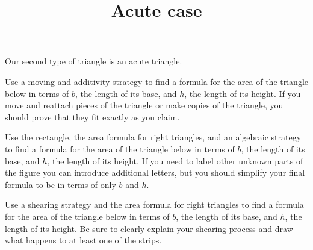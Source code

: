 \documentclass[nooutcomes,noauthor]{ximera}
\title{Acute case}
\begin{document}
\begin{abstract}
\end{abstract}

\maketitle

Our second type of triangle is an acute triangle.

\begin{problem}
Use a moving and additivity strategy to find a formula for the area of the triangle below in terms of $b$, the length of its base, and $h$, the length of its height. If you move and reattach pieces of the triangle or make copies of the triangle, you should prove that they fit exactly as you claim.

\begin{image}
\end{image}
\end{problem} \vfill

\begin{problem}
Use the rectangle, the area formula for right triangles, and an algebraic strategy  to find a formula for the area of the triangle below in terms of $b$, the length of its base, and $h$, the length of its height. If you need to label other unknown parts of the figure you can introduce additional letters, but you should simplify your final formula to be in terms of only $b$ and $h$.

\begin{image}
\end{image}
\end{problem} \vfill

\newpage
\begin{problem}
Use a shearing strategy and the area formula for right triangles to find a formula for the area of the triangle below in terms of $b$, the length of its base, and $h$, the length of its height. Be sure to clearly explain your shearing process and draw what happens to at least one of the strips.

\begin{image}
\end{image}
\end{problem}
\end{document}
